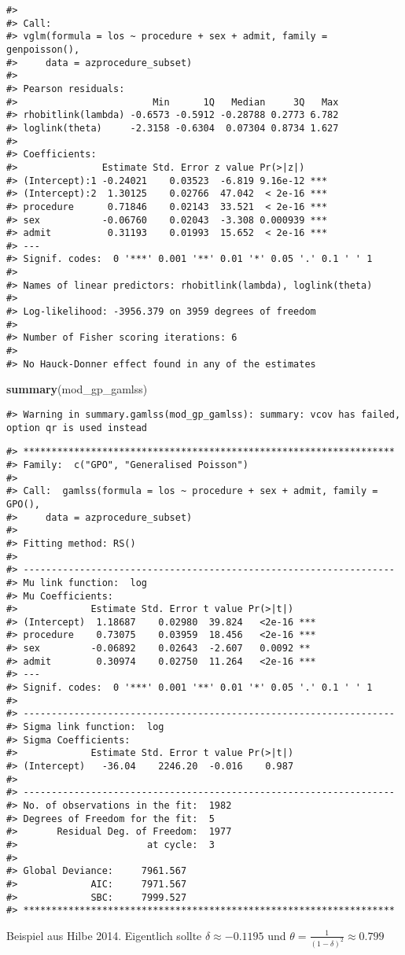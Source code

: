\documentclass[ngerman,a4paper,]{scrartcl}
\newenvironment{Shaded}{\begin{snugshade}}{\end{snugshade}}
\newcommand{\KeywordTok}[1]{\textcolor[rgb]{0.13,0.29,0.53}{\textbf{#1}}}
\newcommand{\NormalTok}[1]{#1}
\theoremstyle{definition}
\theoremstyle{definition}
\theoremstyle{definition}
\theoremstyle{remark}
\begin{document}
\begin{verbatim}
#> 
#> Call:
#> vglm(formula = los ~ procedure + sex + admit, family = genpoisson(), 
#>     data = azprocedure_subset)
#> 
#> Pearson residuals:
#>                        Min      1Q   Median     3Q   Max
#> rhobitlink(lambda) -0.6573 -0.5912 -0.28788 0.2773 6.782
#> loglink(theta)     -2.3158 -0.6304  0.07304 0.8734 1.627
#> 
#> Coefficients: 
#>               Estimate Std. Error z value Pr(>|z|)    
#> (Intercept):1 -0.24021    0.03523  -6.819 9.16e-12 ***
#> (Intercept):2  1.30125    0.02766  47.042  < 2e-16 ***
#> procedure      0.71846    0.02143  33.521  < 2e-16 ***
#> sex           -0.06760    0.02043  -3.308 0.000939 ***
#> admit          0.31193    0.01993  15.652  < 2e-16 ***
#> ---
#> Signif. codes:  0 '***' 0.001 '**' 0.01 '*' 0.05 '.' 0.1 ' ' 1
#> 
#> Names of linear predictors: rhobitlink(lambda), loglink(theta)
#> 
#> Log-likelihood: -3956.379 on 3959 degrees of freedom
#> 
#> Number of Fisher scoring iterations: 6 
#> 
#> No Hauck-Donner effect found in any of the estimates
\end{verbatim}

\begin{Shaded}
\begin{Highlighting}[]
\KeywordTok{summary}\NormalTok{(mod_gp_gamlss)}
\end{Highlighting}
\end{Shaded}

\begin{verbatim}
#> Warning in summary.gamlss(mod_gp_gamlss): summary: vcov has failed, option qr is used instead
\end{verbatim}

\begin{verbatim}
#> ******************************************************************
#> Family:  c("GPO", "Generalised Poisson") 
#> 
#> Call:  gamlss(formula = los ~ procedure + sex + admit, family = GPO(),  
#>     data = azprocedure_subset) 
#> 
#> Fitting method: RS() 
#> 
#> ------------------------------------------------------------------
#> Mu link function:  log
#> Mu Coefficients:
#>             Estimate Std. Error t value Pr(>|t|)    
#> (Intercept)  1.18687    0.02980  39.824   <2e-16 ***
#> procedure    0.73075    0.03959  18.456   <2e-16 ***
#> sex         -0.06892    0.02643  -2.607   0.0092 ** 
#> admit        0.30974    0.02750  11.264   <2e-16 ***
#> ---
#> Signif. codes:  0 '***' 0.001 '**' 0.01 '*' 0.05 '.' 0.1 ' ' 1
#> 
#> ------------------------------------------------------------------
#> Sigma link function:  log
#> Sigma Coefficients:
#>             Estimate Std. Error t value Pr(>|t|)
#> (Intercept)   -36.04    2246.20  -0.016    0.987
#> 
#> ------------------------------------------------------------------
#> No. of observations in the fit:  1982 
#> Degrees of Freedom for the fit:  5
#>       Residual Deg. of Freedom:  1977 
#>                       at cycle:  3 
#>  
#> Global Deviance:     7961.567 
#>             AIC:     7971.567 
#>             SBC:     7999.527 
#> ******************************************************************
\end{verbatim}

Beispiel aus Hilbe 2014. Eigentlich sollte \(\delta \approx -0.1195\) und \(\theta = \frac{1}{(1 - \delta)^2} \approx 0.799\)


\end{document}
